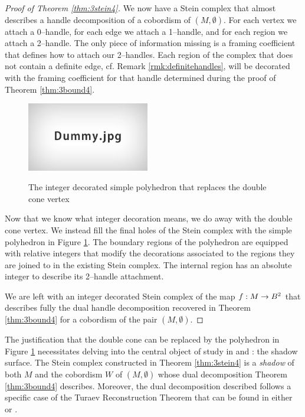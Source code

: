 \begin{proof}[Proof of Theorem \ref{thm:3stein4}]
	We now have a Stein complex that almost describes a handle decomposition of a cobordism of $(M,\emptyset)$.
	For each vertex we attach a 0--handle, for each edge we attach a 1--handle, and for each region we attach a 2--handle.
	The only piece of information missing is a framing coefficient that defines how to attach our 2--handles.
	Each region of the complex that does not contain a definite edge, cf. Remark \ref{rmk:definitehandles}, will be decorated with the framing coefficient for that handle determined during the proof of Theorem \ref{thm:3bound4}.
	
	\begin{figure}
		\centering
		\captionsetup{justification=centering}
		\caption{The integer decorated simple polyhedron that replaces the double cone vertex}
		\includegraphics[height=3cm]{figures/dummy.jpg}
		\label{fig:simplepoly}
	\end{figure}
	
	Now that we know what integer decoration means, we do away with the double cone vertex.
	We instead fill the final holes of the Stein complex with the simple polyhedron in Figure \ref{fig:simplepoly}.
	The boundary regions of the polyhedron are equipped with relative integers that modify the decorations associated to the regions they are joined to in the existing Stein complex.
	The internal region has an absolute integer to describe its 2--handle attachment.
	
	We are left with an integer decorated Stein complex of the map $f:M\to B^2$ that describes fully the dual handle decomposition recovered in Theorem \ref{thm:3bound4} for a cobordism of the pair $(M,\emptyset)$.
\end{proof}

\begin{rmk}
	The justification that the double cone can be replaced by the polyhedron in Figure \ref{fig:simplepoly} necessitates delving into the central object of study in \cite{CostThur08} and \cite{Turaev91}: the shadow surface.
	The Stein complex constructed in Theorem \ref{thm:3stein4} is a \emph{shadow} of both $M$ and the cobordism $W$ of $(M,\emptyset)$ whose dual decomposition Theorem \ref{thm:3bound4} describes.
	Moreover, the dual decomposition described follows a specific case of the Turaev Reconstruction Theorem that can be found in either \cite{CostThur08} or \cite{Turaev91}.
\end{rmk}
